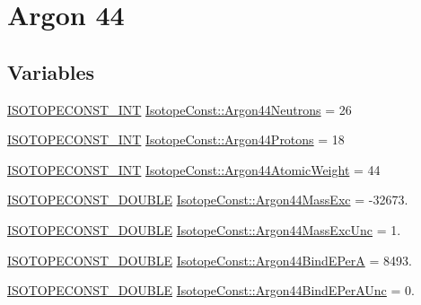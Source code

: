 \hypertarget{group___isotope_const-_argon-_ar44}{}\section{Argon 44}
\label{group___isotope_const-_argon-_ar44}
\subsection*{Variables}
\begin{DoxyCompactItemize}
\item 
\mbox{\hyperlink{group___isotope_const-_macros_ga5f18360b3e99483a35c32d789e62621c}{I\+S\+O\+T\+O\+P\+E\+C\+O\+N\+S\+T\+\_\+\+I\+NT}} \mbox{\hyperlink{group___isotope_const-_argon-_ar44_ga592dfec4cd1269e8ac13e68fa3ea0367}{Isotope\+Const\+::\+Argon44\+Neutrons}} = 26
\item 
\mbox{\hyperlink{group___isotope_const-_macros_ga5f18360b3e99483a35c32d789e62621c}{I\+S\+O\+T\+O\+P\+E\+C\+O\+N\+S\+T\+\_\+\+I\+NT}} \mbox{\hyperlink{group___isotope_const-_argon-_ar44_gab8cbd417c50bf5a34cabc075f941e49e}{Isotope\+Const\+::\+Argon44\+Protons}} = 18
\item 
\mbox{\hyperlink{group___isotope_const-_macros_ga5f18360b3e99483a35c32d789e62621c}{I\+S\+O\+T\+O\+P\+E\+C\+O\+N\+S\+T\+\_\+\+I\+NT}} \mbox{\hyperlink{group___isotope_const-_argon-_ar44_ga011f3f81a9188e06dd934c834c772c92}{Isotope\+Const\+::\+Argon44\+Atomic\+Weight}} = 44
\item 
\mbox{\hyperlink{group___isotope_const-_macros_ga8f45a7272ce02c0b4c65c44636ed719a}{I\+S\+O\+T\+O\+P\+E\+C\+O\+N\+S\+T\+\_\+\+D\+O\+U\+B\+LE}} \mbox{\hyperlink{group___isotope_const-_argon-_ar44_ga853bef59fab513b0fe4a681b948c10f1}{Isotope\+Const\+::\+Argon44\+Mass\+Exc}} = -\/32673.
\item 
\mbox{\hyperlink{group___isotope_const-_macros_ga8f45a7272ce02c0b4c65c44636ed719a}{I\+S\+O\+T\+O\+P\+E\+C\+O\+N\+S\+T\+\_\+\+D\+O\+U\+B\+LE}} \mbox{\hyperlink{group___isotope_const-_argon-_ar44_ga68b415598708dcc7c0b85d2335c2300d}{Isotope\+Const\+::\+Argon44\+Mass\+Exc\+Unc}} = 1.
\item 
\mbox{\hyperlink{group___isotope_const-_macros_ga8f45a7272ce02c0b4c65c44636ed719a}{I\+S\+O\+T\+O\+P\+E\+C\+O\+N\+S\+T\+\_\+\+D\+O\+U\+B\+LE}} \mbox{\hyperlink{group___isotope_const-_argon-_ar44_ga84b4a827135bd01ffc2742d3bf77cbdc}{Isotope\+Const\+::\+Argon44\+Bind\+E\+PerA}} = 8493.
\item 
\mbox{\hyperlink{group___isotope_const-_macros_ga8f45a7272ce02c0b4c65c44636ed719a}{I\+S\+O\+T\+O\+P\+E\+C\+O\+N\+S\+T\+\_\+\+D\+O\+U\+B\+LE}} \mbox{\hyperlink{group___isotope_const-_argon-_ar44_gac5287aaf17e96228c62853e0e75ac0b6}{Isotope\+Const\+::\+Argon44\+Bind\+E\+Per\+A\+Unc}} = 0.

\end{DoxyCompactItemize}
